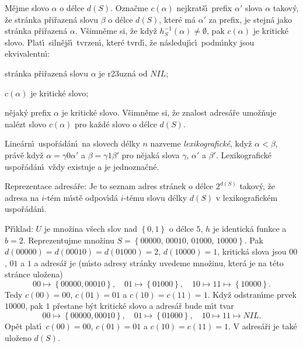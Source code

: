 \flushpar M\v ejme slovo $\alpha$ o d\'elce $d\left(S\right)$. Ozna\v cme $c
\left(\alpha \right)$ nejkrat\v s\'\i\ 
prefix $\alpha'$ slova $\alpha$ takov\'y, \v ze str\'anka p\v ri\v razen\'a slovu $
\beta$ o 
d\'elce $d\left(S\right)$, kter\'e m\'a $\alpha'$ za prefix, je stejn\'a jako str\'anka 
p\v ri\v razen\'a $\alpha$. V\v simn\v eme si, \v ze kdy\v z $h^{
-1}_S\left(\alpha \right)\ne\emptyset$, pak $c\left(\alpha \right)$ je 
kritick\'e slovo. Plat\'\i\ siln\v ej\v s\'\i\ tvrzen\'\i , kter\'e tvrd\'\i , \v ze 
n\'asleduj\'\i c\'\i\ podm\'\i nky jsou ekvivalentn\'\i :
\roster
\item
str\'anka p\v ri\v razen\'a slovu $\alpha$ je r\accent23uzn\'a od $NIL$;
\item
$c\left(\alpha \right)$ je kritick\'e slovo;
\item
n\v ejak\'y prefix $\alpha$ je kritick\'e slovo.
\endroster
V\v simn\v eme si, \v ze znalost adres\'a\v re umo\v z\v nuje nal\'ezt slovo 
$c\left(\alpha \right)$ pro ka\v zd\'e slovo o d\'elce $d\left(S\right)$.
\medskip

\flushpar Line\'arn\'\i\ uspo\v r\'ad\'an\'\i\ na slovech d\'elky $
n$ nazveme 
\emph{lexikografick\'e}, kdy\v z $\alpha <\beta$, pr\'av\v e kdy\v z 
$\alpha =\gamma 0\alpha'$ a $\beta =\gamma 1\beta'$ pro n\v ejak\'a slova $
\gamma$, $\alpha'$ a $\beta'$. 
Lexikografick\'e uspo\v r\'ad\'an\'\i\ v\v zdy existuje a je 
jednozna\v cn\'e.
\medskip

\flushpar Reprezentace adres\'a\v re: Je to seznam adres 
str\'anek o d\'elce $2^{d\left(S\right)}$ takov\'y, \v ze adresa na $i$-t\'em m\'\i st\v e 
odpov\'\i d\'a $i$-t\'emu slovu d\'elky $d\left(S\right)$ v lexikografick\'em 
uspo\v r\'ad\'an\'\i .

\flushpar P\v r\'\i klad: $U$ je mno\v zina v\v sech slov nad $\left\{
0,1\right\}$ o 
d\'elce $5$, $h$ 
je identick\'a funkce a $b=2$. Reprezentujme mno\v zinu  
$S=\left\{00000,\,00010,\,01000,\,10000\right\}$. Pak 
$d\left(00000\right)=d\left(00010\right)=d\left(01000\right)=2$, $d\left(10000\right)=1$, kritick\'a slova 
jsou $00$, $01$ a $1$ a adres\'a\v r je (m\'\i sto adresy str\'anky 
uvedeme mno\v zinu, kter\'a je na t\'eto str\'ance ulo\v zena)
$$00\mapsto \left\{00000,00010\right\},\quad 01\mapsto \left\{01000\right\},\quad 10\mapsto 
11\mapsto \left\{10000\right\}.$$
Tedy $c\left(00\right)=00$, $c\left(01\right)=01$ a $c\left(10\right)=c\left(11\right)=1$.
Kdy\v z odstran\'\i me prvek $10000$, pak $1$ p\v restane b\'yt kritick\'e 
slovo a adres\'a\v r bude m\'\i t tvar
$$00\mapsto \left\{00000,00010\right\},\quad 01\mapsto \left\{01000\right\},\quad 10\mapsto 
11\mapsto NIL.$$
Op\v et plat\'\i\ $c\left(00\right)=00$, $c\left(01\right)=01$ a $c\left(10\right)=c\left(11\right)=1$.
V adres\'a\v ri je tak\'e ulo\v zeno $d\left(S\right)$.
\medskip

